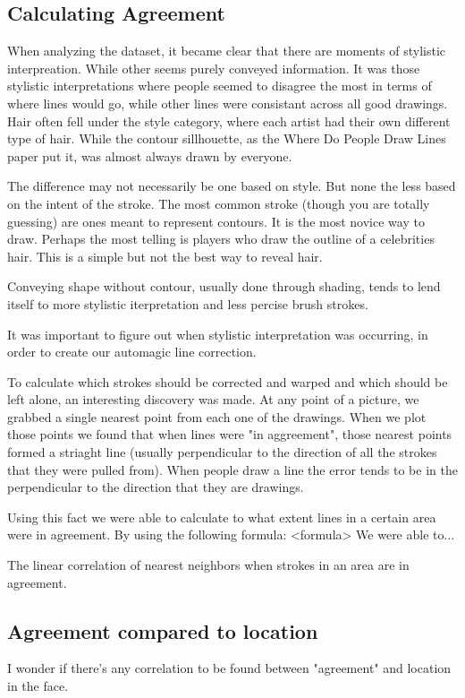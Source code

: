 \subsection{Calculating Agreement}
When analyzing the dataset, it became clear that there are moments of stylistic interpreation. While other seems purely conveyed information. It was those stylistic interpretations where people seemed to disagree the most in terms of where lines would go, while other lines were consistant across all good drawings. Hair often fell under the style category, where each artist had their own different type of hair. While the contour sillhouette, as the Where Do People Draw Lines paper put it, was almost always drawn by everyone. 

The difference may not necessarily be one based on style. But none the less based on the intent of the stroke. The most common stroke (though you are totally guessing) are ones meant to represent contours. It is the most novice way to draw. Perhaps the most telling is players who draw the outline of a celebrities hair. This is a simple but not the best way to reveal hair. 

Conveying shape without contour, usually done through shading, tends to lend itself to more stylistic iterpretation and less percise brush strokes. 

It was important to figure out when stylistic interpretation was occurring, in order to create our automagic line correction. 

To calculate which strokes should be corrected and warped and which should be left alone, an interesting discovery was made. At any point of a picture, we grabbed a single nearest point from each one of the drawings. When we plot those points we found that when lines were "in aggreement", those nearest points formed a striaght line (usually perpendicular to the direction of all the strokes that they were pulled from). When people draw a line the error tends to be in the perpendicular to the direction that they are drawings.

Using this fact we were able to calculate to what extent lines in a certain area were in agreement. By using the following formula:
<formula>
We were able to...

The linear correlation of nearest neighbors when strokes in an area are in agreement.

\subsection{Agreement compared to location}
I wonder if there's any correlation to be found between "agreement" and location in the face.


